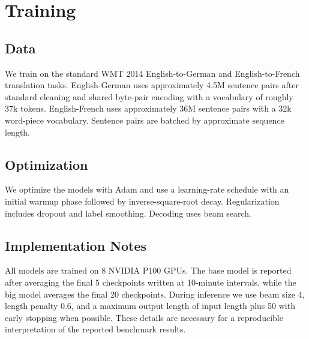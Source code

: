 \section{Training}

\subsection{Data}

We train on the standard WMT 2014 English-to-German and English-to-French translation tasks. English-German uses approximately 4.5M sentence pairs after standard cleaning and shared byte-pair encoding with a vocabulary of roughly 37k tokens. English-French uses approximately 36M sentence pairs with a 32k word-piece vocabulary. Sentence pairs are batched by approximate sequence length.

\subsection{Optimization}

We optimize the models with Adam and use a learning-rate schedule with an initial warmup phase followed by inverse-square-root decay. Regularization includes dropout and label smoothing. Decoding uses beam search.

\subsection{Implementation Notes}

All models are trained on 8 NVIDIA P100 GPUs. The base model is reported after averaging the final 5 checkpoints written at 10-minute intervals, while the big model averages the final 20 checkpoints. During inference we use beam size 4, length penalty 0.6, and a maximum output length of input length plus 50 with early stopping when possible. These details are necessary for a reproducible interpretation of the reported benchmark results.

